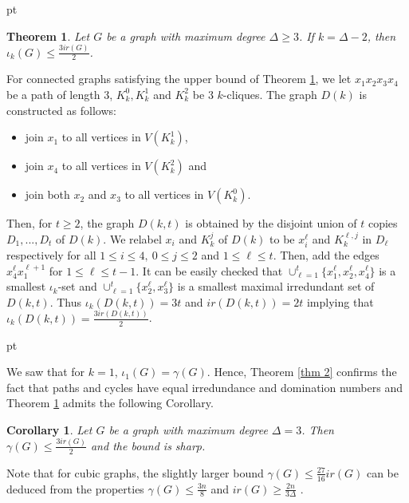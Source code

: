 \documentclass[11pt]{article}
\newtheorem{thm}{Theorem}
\newtheorem{cor}{Corollary}
\newcommand{\2}{ \vspace{0.2cm} }
\newcommand{\1}{ \vspace{0.1cm} }
\begin{document}
 pt


\begin{thm}\label{thm 3}
Let $G$ be a graph with maximum degree $\Delta \ge 3$. If $k = \Delta - 2$, then $\iota_{k}(G) \leq \frac{3ir(G)}{2}$.
\end{thm}

\indent For  connected graphs satisfying the upper bound of Theorem \ref{thm 3}, we let $x_{1}x_{2}x_{3}x_{4}$ be a path of length $3$, $K^{0}_{k}, K^{1}_{k}$ and $K^{2}_{k}$ be $3$ $k$-cliques. The graph $D(k)$ is constructed as follows:
\begin{itemize}
  \item join $x_{1}$ to all vertices in $V(K^{1}_{k})$,
  \item join $x_{4}$ to all vertices in $V(K^{2}_{k})$ and
  \item join both $x_{2}$ and $x_{3}$ to all vertices in $V(K^{0}_{k})$.
\end{itemize}
\noindent Then, for $t\ge 2$, the graph $D(k, t)$ is obtained by the disjoint union of $t$ copies $D_{1}, ..., D_{t}$ of $D(k)$. We relabel $x_{i}$ and $K^{j}_{k}$ of $D(k)$ to be $x^{\ell}_{i}$ and $K^{\ell, j}_{k}$ in $D_{\ell}$ respectively for all $1 \leq i \leq 4,~ 0 \leq j \leq 2$ and $1 \leq \ell \leq t$.  Then, add the edges $x_4^{\ell}x_1^{\ell +1}$ for $1 \leq \ell \leq t - 1$.
It can be easily checked  that
$\cup^{t}_{\ell = 1}\{ x^{\ell}_{1}, x^{\ell}_{2}, x^{\ell}_{4}\}$
is a smallest $\iota_{k}$-set and $\cup^{t}_{\ell = 1}\{x^{\ell}_{2}, x^{\ell}_{3}\}$ is a smallest maximal irredundant set of $D(k, t)$. Thus $\iota_{k}(D(k, t)) = 3t$ and $ir(D(k, t)) = 2t$ implying that $\iota_{k}(D(k, t)) = \frac{3ir(D(k, t))}{2}$.


 pt

We saw that for $k=1$, $\iota_1(G)=\gamma(G)$. Hence, Theorem \ref{thm 2} confirms the fact that paths and cycles have equal irredundance and domination numbers and Theorem \ref{thm 3} admits the following Corollary.

\begin{cor} \label{cor 1}
Let $G$ be a graph with maximum degree $\Delta = 3$. Then  $\gamma(G)\le \frac{3ir(G)}{2}$ and the bound is sharp.
\end{cor}
Note that for cubic graphs, the slightly larger bound $\gamma (G)\le \frac{27}{16}ir(G)$ can be deduced from the properties $\gamma (G)\le \frac{3n}{8}$ \cite{Re} and $ir(G)\ge \frac{2n}{3\Delta}$ \cite{CoMy}.
\end{document}
